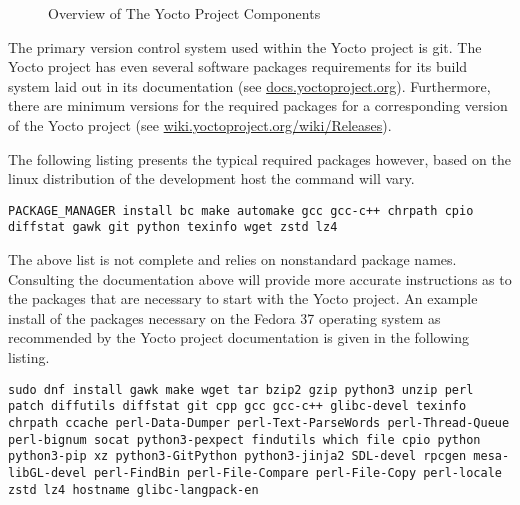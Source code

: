 \begin{figure}[h]
	\caption{Overview of The Yocto Project Components}
	\label{fig:yocto-overview}
\end{figure}

The primary version control system used within the Yocto project is git. The Yocto project has even several software packages requirements for its build system laid out in its documentation (see \href{https://docs.yoctoproject.org/}{docs.yoctoproject.org}). Furthermore, there are minimum versions for the required packages for a corresponding version of the Yocto project (see \href{https://wiki.yoctoproject.org/wiki/Releases}{wiki.yoctoproject.org/wiki/Releases}).

The following listing presents the typical required packages however, based on the linux distribution of the development host the command will vary.

\begin{verbatim}
PACKAGE_MANAGER install bc make automake gcc gcc-c++ chrpath cpio diffstat gawk git python texinfo wget zstd lz4
\end{verbatim}

The above list is not complete and relies on nonstandard package names. Consulting the documentation above will provide more accurate instructions as to the packages that are necessary to start with the Yocto project. An example install of the packages necessary on the Fedora 37 operating system as recommended by the Yocto project documentation is given in the following listing.

\begin{verbatim}
sudo dnf install gawk make wget tar bzip2 gzip python3 unzip perl patch diffutils diffstat git cpp gcc gcc-c++ glibc-devel texinfo chrpath ccache perl-Data-Dumper perl-Text-ParseWords perl-Thread-Queue perl-bignum socat python3-pexpect findutils which file cpio python python3-pip xz python3-GitPython python3-jinja2 SDL-devel rpcgen mesa-libGL-devel perl-FindBin perl-File-Compare perl-File-Copy perl-locale zstd lz4 hostname glibc-langpack-en
\end{verbatim}

